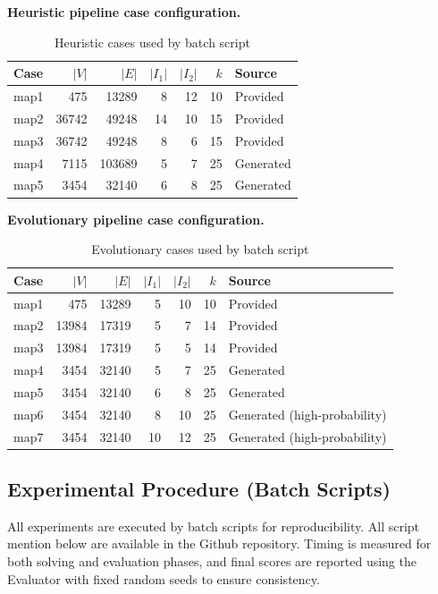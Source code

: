 \documentclass[onecolumn,a4paper,12pt]{IEEEtran}
\begin{document}
\textbf{Heuristic pipeline case configuration.}
\begin{table}[h]
\centering
\caption{Heuristic cases used by batch script}
\label{tab:heur_cases}
\begin{tabular}{lrrrrrl}
\toprule
Case & $|V|$ & $|E|$ & $|I_1|$ & $|I_2|$ & $k$ & Source \\
\midrule
map1 & 475   & 13289  & 8  & 12 & 10 & Provided \\
map2 & 36742 & 49248  & 14 & 10 & 15 & Provided \\
map3 & 36742 & 49248  & 8  & 6  & 15 & Provided \\
map4 & 7115  & 103689 & 5  & 7  & 25 & Generated \\
map5 & 3454  & 32140  & 6  & 8  & 25 & Generated \\
\bottomrule
\end{tabular}
\end{table}

\textbf{Evolutionary pipeline case configuration.}
\begin{table}[h]
\centering
\caption{Evolutionary cases used by batch script}
\label{tab:evo_cases}
\begin{tabular}{lrrrrrl}
\toprule
Case & $|V|$ & $|E|$ & $|I_1|$ & $|I_2|$ & $k$ & Source \\
\midrule
map1 & 475   & 13289 & 5 & 10 & 10 & Provided \\
map2 & 13984 & 17319 & 5 & 7  & 14 & Provided \\
map3 & 13984 & 17319 & 5 & 5  & 14 & Provided \\
map4 & 3454  & 32140 & 5 & 7  & 25 & Generated \\
map5 & 3454  & 32140 & 6 & 8  & 25 & Generated \\
map6 & 3454  & 32140 & 8 & 10 & 25 & Generated (high-probability) \\
map7 & 3454  & 32140 & 10 & 12 & 25 & Generated (high-probability) \\
\bottomrule
\end{tabular}
\end{table}

\subsection{Experimental Procedure (Batch Scripts)}
All experiments are executed by batch scripts for reproducibility. All script mention below are available in the Github repository. Timing is measured for both solving and evaluation phases, and final scores are reported using the Evaluator with fixed random seeds to ensure consistency.
\end{document}
